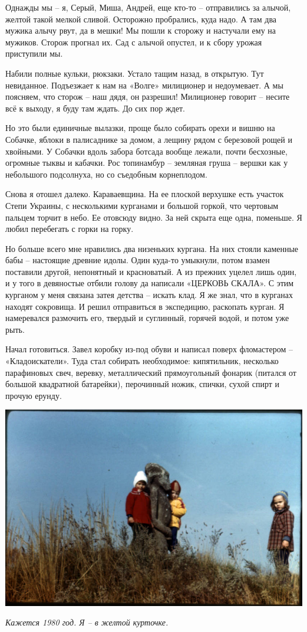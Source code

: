 Однажды мы – я, Серый, Миша, Андрей, еще кто-то – отправились за алычой, желтой такой мелкой сливой. Осторожно пробрались, куда надо. А там два мужика алычу рвут, да в мешки! Мы пошли к сторожу и настучали ему на мужиков. Сторож прогнал их. Сад с алычой опустел, и к сбору урожая приступили мы.
 
Набили полные кульки, рюкзаки. Устало тащим назад, в открытую. Тут невиданное. Подъезжает к нам на «Волге» милиционер и недоумевает. А мы поясняем, что сторож – наш дядя, он разрешил! Милиционер говорит – несите всё к выходу, я буду там ждать. До сих пор ждет.

Но это были единичные вылазки, проще было собирать орехи и вишню на Собачке, яблоки в палисаднике за домом, а лещину рядом с березовой рощей и хвойными. У Собачки вдоль забора ботсада вообще лежали, почти бесхозные, огромные тыквы и кабачки. Рос топинамбур – земляная груша – вершки как у небольшого подсолнуха, но со съедобным корнеплодом.

Снова я отошел далеко. Караваевщина. На ее плоской верхушке есть участок Степи Украины, с несколькими курганами и большой горкой, что чертовым пальцем торчит в небо. Ее отовсюду видно. За ней скрыта еще одна, поменьше. Я любил перебегать с горки на горку.

Но больше всего мне нравились два низеньких кургана. На них стояли каменные бабы – настоящие древние идолы. Один куда-то умыкнули, потом взамен поставили другой, непонятный и красноватый. А из прежних уцелел лишь один, и у того в девяностые отбили голову да написали «ЦЕРКОВЬ СКАЛА». С этим курганом у меня связана затея детства – искать клад. Я же знал, что в курганах находят сокровища. И решил отправиться в экспедицию, раскопать курган. Я намеревался размочить его, твердый и суглинный, горячей водой, и потом уже рыть.

Начал готовиться. Завел коробку из-под обуви и написал поверх фломастером – «Кладоискатели». Туда стал собирать необходимое: кипятильник, несколько парафиновых свеч, веревку, металлический прямоугольный фонарик (питался от большой квадратной батарейки), перочинный ножик, спички, сухой спирт и прочую ерунду.  

\begin{center}
\includegraphics[width=\linewidth]{chast-vosp/zver/ya-na-kurgane.jpg}

\textit{Кажется 1980 год. Я – в желтой курточке.}
\end{center}

